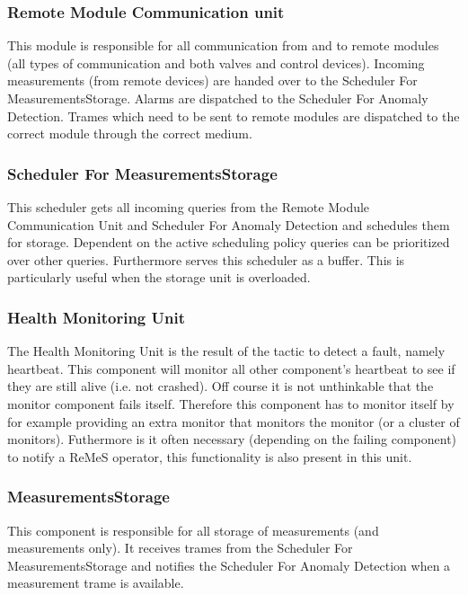 
\subsubsection{Remote Module Communication unit}

\npar This module is responsible for all communication from and to remote
modules (all types of communication and both valves and control devices).
Incoming measurements (from remote devices) are handed over to the Scheduler For
MeasurementsStorage. Alarms are dispatched to the Scheduler For Anomaly
Detection. Trames which need to be sent to remote modules are dispatched to the
correct module through the correct medium.

\subsubsection{Scheduler For MeasurementsStorage}

\npar This scheduler gets all incoming queries from the Remote Module
Communication Unit and Scheduler For Anomaly Detection and schedules them for
storage. Dependent on the active scheduling policy queries can be prioritized
over other queries. Furthermore serves this scheduler as a buffer. This is
particularly useful when the storage unit is overloaded.

\subsubsection{Health Monitoring Unit}

\npar The Health Monitoring Unit is the result of the tactic to detect a
fault, namely heartbeat. This component will monitor all other component's
heartbeat to see if they are still alive (i.e. not crashed). Off course it is
not unthinkable that the monitor component fails itself. Therefore this
component has to monitor itself by for example providing an extra monitor that
monitors the monitor (or a cluster of monitors). Futhermore is it often
necessary (depending on the failing component) to notify a ReMeS operator, this
functionality is also present in this unit.

\subsubsection{MeasurementsStorage}

\npar This component is responsible for all storage of measurements (and
measurements only). It receives trames from the Scheduler For
MeasurementsStorage and notifies the Scheduler For Anomaly Detection when a
measurement trame is available.

